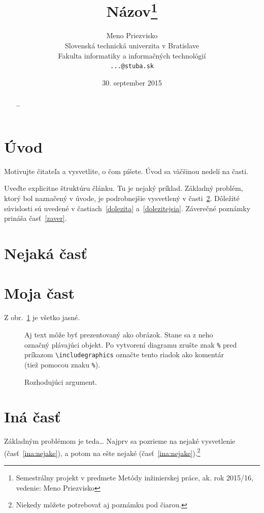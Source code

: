 \documentclass[10pt,twoside,slovak,a4paper]{article}
\title{Názov\thanks{Semestrálny projekt v predmete Metódy inžinierskej práce, ak. rok 2015/16, vedenie: Meno Priezvisko}} %
\author{Meno Priezvisko\\[2pt]
	{\small Slovenská technická univerzita v Bratislave}\\
	{\small Fakulta informatiky a informačných technológií}\\
	{\small \texttt{...@stuba.sk}}
	}
\date{\small 30. september 2015} %
\begin{document}
\maketitle

\begin{abstract}
\ldots
\end{abstract}



\section{Úvod}

Motivujte čitateľa a vysvetlite, o čom píšete. Úvod sa väčšinou nedelí na časti.

Uveďte explicitne štruktúru článku. Tu je nejaký príklad.
Základný problém, ktorý bol naznačený v úvode, je podrobnejšie vysvetlený v časti~\ref{nejaka}.
Dôležité súvislosti sú uvedené v častiach~\ref{dolezita} a~\ref{dolezitejsia}.
Záverečné poznámky prináša časť~\ref{zaver}.



\section{Nejaká časť} \label{nejaka}
\section {Moja čast} \label{moja}

Z obr.~\ref{f:rozhod} je všetko jasné. 

\begin{figure}[tbh]
\centering
Aj text môže byť prezentovaný ako obrázok. Stane sa z neho označný plávajúci objekt. Po vytvorení diagramu zrušte znak \texttt{\%} pred príkazom \verb|\includegraphics| označte tento riadok ako komentár (tiež pomocou znaku \texttt{\%}).
\caption{Rozhodujúci argument.}
\label{f:rozhod}
\end{figure}



\section{Iná časť} \label{ina}

Základným problémom je teda\ldots{} Najprv sa pozrieme na nejaké vysvetlenie (časť~\ref{ina:nejake}), a potom na ešte nejaké (časť~\ref{ina:nejake}).\footnote{Niekedy môžete potrebovať aj poznámku pod čiarou.}
\end{document}
